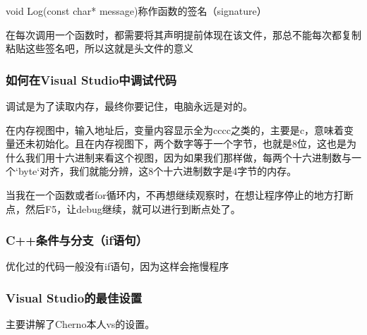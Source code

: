 {\ncodestyle void Log(const char* message)}称作函数的签名（{\ncodestyle signature}）

在每次调用一个函数时，都需要将其声明提前体现在该文件，那总不能每次都复制粘贴这些签名吧，所以这就是头文件的意义

\subsubsection{如何在Visual Studio中调试代码}
调试是为了读取内存，最终你要记住，电脑永远是对的。

在内存视图中，输入地址后，变量内容显示全为{\ncodestyle cccc}之类的，主要是{\ncodestyle c}，意味着变量还未初始化。且在内存视图下，两个数字等于一个字节，也就是8位，这也是为什么我们用十六进制来看这个视图，因为如果我们那样做，每两个十六进制数与一个`byte`对齐，我们就能分辨，这8个十六进制数字是4字节的内存。

当我在一个函数或者{\ncodestyle for}循环内，不再想继续观察时，在想让程序停止的地方打断点，然后{\ncodestyle F5}，让{\ncodestyle debug}继续，就可以进行到断点处了。

\subsubsection{C++条件与分支（if语句）}
优化过的代码一般没有{\ncodestyle if}语句，因为这样会拖慢程序

\subsubsection{Visual Studio的最佳设置}

主要讲解了Cherno本人vs的设置。


